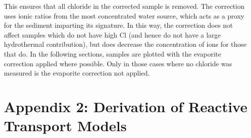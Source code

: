 This ensures that all chloride in the corrected sample is removed. The correction uses ionic ratios from the most concentrated water source, which acts as a proxy for the sediment imparting its signature.  In this way, the correction does not affect samples which do not have high Cl (and hence do not have a large hydrothermal contribution), but does decrease the concentration of ions for those that do. In the following sections, samples are plotted with the evaporite correction applied where possible. Only in those cases where no chloride was measured is the evaporite correction not applied.

\newpage


\section*{Appendix 2: Derivation of Reactive Transport Models}

\renewcommand{\thetable}{A\arabic{table}}  %

